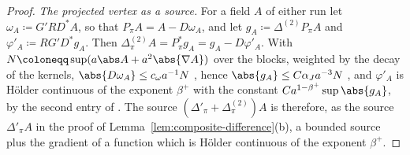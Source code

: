 \begin{proof}
\emph{The projected vertex as a source.} For a field $A$ of either run let $\omega_A \coloneqq G'RD^*A$, so that $P_\pi A = A - D\omega_A$, and let $g_A \coloneqq \Delta^{(2)}P_\pi A$ and $\varphi'_A \coloneqq RG'D^*g_A$. Then $\Delta^{(2)}_\pi A = P_\pi^*g_A = g_A - D\varphi'_A$. With $N \coloneqq \sup(a\abs A + a^2\abs{\nabla A})$ over the blocks, weighted by the decay of the kernels, $\abs{D\omega_A} \leq c_\omega a^{-1}N$ \cite[(3.42), (3.49)]{BalabanPBG}, hence $\abs{g_A} \leq C\alpha_Ja^{-3}N$ \cite[(3.137)]{BalabanPBG}, and $\varphi'_A$ is H\"older continuous of the exponent $\beta^+$ with the constant $Ca^{1-\beta^+}\sup\abs{g_A}$, by the second entry of \cite[(3.43)]{BalabanPBG}. The source $(\Delta'_\pi + \Delta^{(2)}_\pi)A$ is therefore, as the source $\Delta'_\pi A$ in the proof of Lemma~\ref{lem:composite-difference}(b), a bounded source plus the gradient of a function which is H\"older continuous of the exponent $\beta^+$.


\end{proof}
